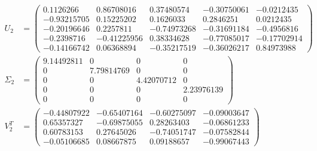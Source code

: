 \documentclass[conference,onecolumn]{IEEEtran}
\begin{document}
\begin{enumerate}[label=\arabic{enumi}.]
\begin{enumerate}
\begin{enumerate}
\begin{align*}
                                  U_2      & =
                                  \begin{pmatrix}
                                      0.1126266   & 0.86708016  & 0.37480574  & -0.30750061 & -0.0212435  \\
                                      -0.93215705 & 0.15225202  & 0.1626033   & 0.2846251   & 0.0212435   \\
                                      -0.20196646 & 0.2257811   & -0.74973268 & -0.31691184 & -0.4956816  \\
                                      -0.2398716  & -0.41225956 & 0.38334628  & -0.77085017 & -0.17702914 \\
                                      -0.14166742 & 0.06368894  & -0.35217519 & -0.36026217 & 0.84973988
                                  \end{pmatrix} \\
                                  \Sigma_2 & =
                                  \begin{pmatrix}
                                      9.14492811 & 0          & 0          & 0          \\
                                      0          & 7.79814769 & 0          & 0          \\
                                      0          & 0          & 4.42070712 & 0          \\
                                      0          & 0          & 0          & 2.23976139 \\
                                      0          & 0          & 0          & 0
                                  \end{pmatrix} \\
                                  V_2^T    & =
                                  \begin{pmatrix}
                                      -0.44807922 & -0.65407164 & -0.60275097 & -0.09003647 \\
                                      0.65357327  & -0.69875055 & 0.28263403  & -0.06861233 \\
                                      0.60783153  & 0.27645026  & -0.74051747 & -0.07582844 \\
                                      -0.05106685 & 0.08667875  & 0.09188657  & -0.99067443
                                  \end{pmatrix}
                              \end{align*}

\end{enumerate}
\end{enumerate}
\end{enumerate}
\end{document}
